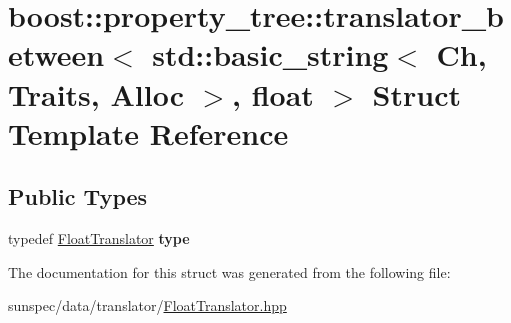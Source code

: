 \hypertarget{structboost_1_1property__tree_1_1translator__between_3_01std_1_1basic__string_3_01_ch_00_01_trai1c3d58fa2e052daa59843faa40bf0e06}{}\section{boost\+:\+:property\+\_\+tree\+:\+:translator\+\_\+between$<$ std\+:\+:basic\+\_\+string$<$ Ch, Traits, Alloc $>$, float $>$ Struct Template Reference}
\label{structboost_1_1property__tree_1_1translator__between_3_01std_1_1basic__string_3_01_ch_00_01_trai1c3d58fa2e052daa59843faa40bf0e06}
\subsection*{Public Types}
\begin{DoxyCompactItemize}
\item 
\mbox{\label{structboost_1_1property__tree_1_1translator__between_3_01std_1_1basic__string_3_01_ch_00_01_trai1c3d58fa2e052daa59843faa40bf0e06_a328638c02c539d4387abc0937f46a544}} 
typedef \hyperlink{struct_float_translator}{Float\+Translator} {\bfseries type}
\end{DoxyCompactItemize}


The documentation for this struct was generated from the following file\+:\begin{DoxyCompactItemize}
\item 
sunspec/data/translator/\hyperlink{_float_translator_8hpp}{Float\+Translator.\+hpp}\end{DoxyCompactItemize}
